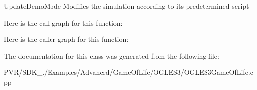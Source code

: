   Update\+Demo\+Mode  Modifies the simulation according to its predetermined script 

Here is the call graph for this function\+:




Here is the caller graph for this function\+:




The documentation for this class was generated from the following file\+:\begin{DoxyCompactItemize}
\item 
P\+V\+R/\+S\+D\+K\+\_./\+Examples/\+Advanced/\+Game\+Of\+Life/\+O\+G\+L\+E\+S3/O\+G\+L\+E\+S3\+Game\+Of\+Life.\+cpp\end{DoxyCompactItemize}
